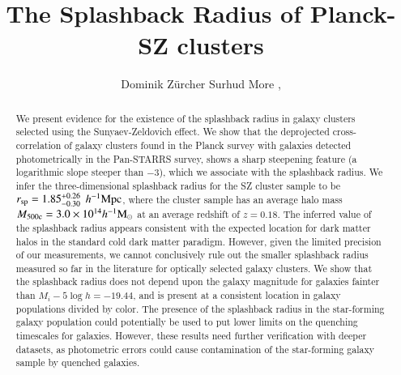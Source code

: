 \documentclass[iop, apjl, twocolappendix, numberedappendix]{emulateapj}
\def\mpch{h^{-1}{\rm Mpc}}
\def\msunh{h^{-1}{\rm M_{\odot}}}
\begin{document}
\title{The Splashback Radius of Planck-SZ clusters}

\author{
Dominik Zürcher 
Surhud More , 
}

\begin{abstract}
We present evidence for the existence of the splashback radius in
galaxy clusters selected using the Sunyaev-Zeldovich effect.  We show
that the deprojected cross-correlation of galaxy clusters found in the
Planck survey with galaxies detected photometrically in the Pan-STARRS
survey, shows a sharp steepening feature (a logarithmic slope steeper
than $-3$), which we associate with the splashback radius. We infer
the three-dimensional splashback radius for the SZ cluster sample to
be $r_{\rm sp}=1.85_{-0.30}^{+0.26}$ $\mpch$, where the cluster sample
has an average halo mass $M_{\rm 500c}=3.0\times10^{14}\msunh$ at an
average redshift of $z=0.18$. The inferred value of the splashback
radius appears consistent with the expected location for dark matter halos
in the standard cold dark matter paradigm. However, given the limited
precision of our measurements, we cannot conclusively rule out the
smaller splashback radius measured so far in the literature for
optically selected galaxy clusters. We show that the splashback radius
does not depend upon the galaxy magnitude for galaxies fainter than
$M_i-5\log h=-19.44$, and is present at a consistent location in
galaxy populations divided by color. The presence of the splashback
radius in the star-forming galaxy population could potentially be used
to put lower limits on the quenching timescales for galaxies. However,
these results need further verification with deeper datasets, as
photometric errors could cause contamination of the star-forming
galaxy sample by quenched galaxies.

\end{abstract}

\end{document}
